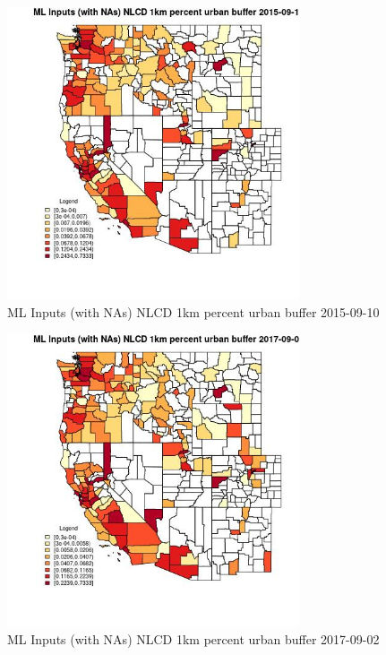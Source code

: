 \begin{figure} 
\centering  
\includegraphics[width=0.77\textwidth]{Code_Outputs/Report_ML_input_PM25_Step4_part_e_de_duplicated_aves_compiled_2019-05-20wNAs_CountyNLCD_1km_percent_urban_bufferMean2015-09-10.jpg} 
\caption{\label{fig:Report_ML_input_PM25_Step4_part_e_de_duplicated_aves_compiled_2019-05-20wNAsCountyNLCD_1km_percent_urban_bufferMean2015-09-10}ML Inputs (with NAs) NLCD 1km percent urban buffer 2015-09-10} 
\end{figure} 
 

\begin{figure} 
\centering  
\includegraphics[width=0.77\textwidth]{Code_Outputs/Report_ML_input_PM25_Step4_part_e_de_duplicated_aves_compiled_2019-05-20wNAs_CountyNLCD_1km_percent_urban_bufferMean2017-09-02.jpg} 
\caption{\label{fig:Report_ML_input_PM25_Step4_part_e_de_duplicated_aves_compiled_2019-05-20wNAsCountyNLCD_1km_percent_urban_bufferMean2017-09-02}ML Inputs (with NAs) NLCD 1km percent urban buffer 2017-09-02} 
\end{figure} 
 

